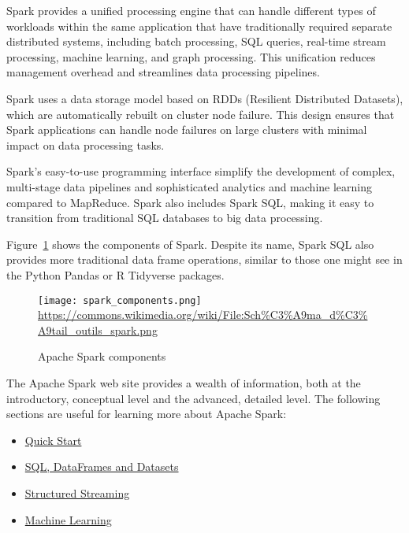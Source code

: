 Spark provides a unified processing engine that can handle different types of workloads within the same application that have traditionally required separate distributed systems, including batch processing, SQL queries, real-time stream processing, machine learning, and graph processing. This unification reduces management overhead and streamlines data processing pipelines.

Spark uses a data storage model based on RDDs (Resilient Distributed Datasets), which are automatically rebuilt on cluster node failure. This design ensures that Spark applications can handle node failures on large clusters with minimal impact on data processing tasks.

Spark's easy-to-use programming interface simplify the development of complex, multi-stage data pipelines and sophisticated analytics and machine learning compared to MapReduce. Spark also includes Spark SQL, making it easy to transition from traditional SQL databases to big data processing.

Figure~\ref{fig:sparkcomponents} shows the components of Spark. Despite its name, Spark SQL also provides more traditional data frame operations, similar to those one might see in the Python Pandas or R Tidyverse packages. 

\begin{figure}
\centering

\texttt{[image: spark\_components.png]}
\scriptsize \url{https://commons.wikimedia.org/wiki/File:Sch\%C3\%A9ma_d\%C3\%A9tail_outils_spark.png} \normalsize
\caption{Apache Spark components}
\label{fig:sparkcomponents}
\end{figure}

\begin{tcolorbox}[colback=code]
The Apache Spark web site provides a wealth of information, both at the introductory, conceptual level and the advanced, detailed level. The following sections are useful for learning more about Apache Spark:

\begin{itemize}
\item \href{https://spark.apache.org/docs/latest/quick-start.html}{Quick Start}
\item \href{https://spark.apache.org/docs/latest/sql-programming-guide.html}{SQL, DataFrames and Datasets}
\item \href{https://spark.apache.org/docs/latest/structured-streaming-programming-guide.html}{Structured Streaming}
\item \href{https://spark.apache.org/docs/latest/ml-guide.html}{Machine Learning}
\end{itemize}
\end{tcolorbox}

